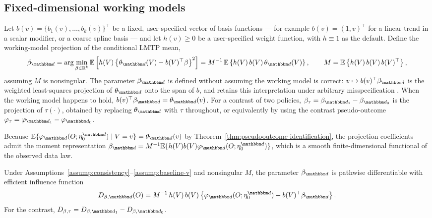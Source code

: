 \documentclass[11pt]{article}
\begin{document}
\subsection{Fixed-dimensional working models}
\label{subsubsec:msm-fixed}

Let \(b(v)=\{b_1(v),\ldots,b_k(v)\}^\top\) be a fixed, user-specified vector of
basis functions --- for example \(b(v)=(1,v)^\top\) for a linear trend in a
scalar modifier, or a coarse spline basis --- and let \(h(v)\ge 0\) be a
user-specified weight function, with \(h\equiv 1\) as the default. Define the
working-model projection of the conditional LMTP mean,
\[
  \beta_{\d}
  =
  \arg\min_{\beta\in\R^k}
  \E
  \left[
    h(V)
    \left\{
      \theta_{\d}(V)
      -
      b(V)^\top\beta
    \right\}^2
  \right]
  =
  M^{-1}
  \,
  \E
  \left\{
    h(V)\,b(V)\,\theta_{\d}(V)
  \right\},
  \qquad
  M
  =
  \E
  \left\{
    h(V)\,b(V)\,b(V)^\top
  \right\},
\]
assuming \(M\) is nonsingular. The parameter \(\beta_{\d}\) is defined without
assuming the working model is correct: \(v\mapsto b(v)^\top\beta_{\d}\) is the
weighted least-squares projection of \(\theta_{\d}\) onto the span of \(b\),
and retains this interpretation under arbitrary misspecification
\cite{neugebauer2007nonparametric,rosenblum2010msm}. When the working model
happens to hold, \(b(v)^\top\beta_{\d}=\theta_{\d}(v)\). For a contrast of two
policies, \(\beta_\tau=\beta_{\d_1}-\beta_{\d_0}\) is the projection of
\(\tau(\cdot)\), obtained by replacing \(\theta_{\d}\) with \(\tau\) throughout,
or equivalently by using the contrast pseudo-outcome
\(\varphi_\tau=\varphi_{\d_1}-\varphi_{\d_0}\).

Because
\(\E\{\varphi_{\d}(O;\eta_0^{\d})\mid V=v\}=\theta_{\d}(v)\) by
Theorem~\ref{thm:pseudooutcome-identification}, the projection coefficients
admit the moment representation
\(\beta_{\d}=M^{-1}\E\{h(V)b(V)\varphi_{\d}(O;\eta_0^{\d})\}\), which is a
smooth finite-dimensional functional of the observed data law.

\begin{proposition}
\label{prop:msm-eif}
Under Assumptions~\ref{assump:consistency}--\ref{assump:baseline-v} and
nonsingular \(M\), the parameter \(\beta_{\d}\) is pathwise differentiable with
efficient influence function
\[
  D_{\beta,\d}(O)
  =
  M^{-1}
  \,
  h(V)\,b(V)
  \left\{
    \varphi_{\d}(O;\eta_0^{\d})
    -
    b(V)^\top\beta_{\d}
  \right\}.
\]
For the contrast, \(D_{\beta,\tau}=D_{\beta,\d_1}-D_{\beta,\d_0}\).
\end{proposition}
\end{document}
